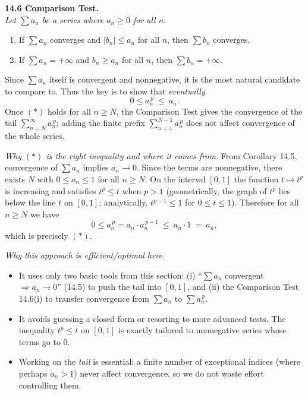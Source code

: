\documentclass[12pt]{article}
\begin{document}
\noindent\textbf{14.6 Comparison Test.}\\
\textit{Let $\sum a_n$ be a series where $a_n \ge 0$ for all $n$.}
\begin{enumerate}[label=(\roman*), leftmargin=2.5em, itemsep=0.25em]
  \item If $\sum a_n$ converges and $|b_n| \le a_n$ for all $n$, then $\sum b_n$ converges.
  \item If $\sum a_n = +\infty$ and $b_n \ge a_n$ for all $n$, then $\sum b_n = +\infty$.
\end{enumerate}

Since $\sum a_n$ itself is convergent and nonnegative, it is the most natural candidate to compare to. Thus the key is to show that \emph{eventually}
\[
0\le a_n^{\,p}\ \le\ a_n .
\tag{$\ast$}
\]
Once $(\ast)$ holds for all $n\ge N$, the Comparison Test gives the convergence of the tail $\sum_{n=N}^\infty a_n^{\,p}$; adding the finite prefix $\sum_{n=1}^{N-1} a_n^{\,p}$ does not affect convergence of the whole series.

\emph{Why $(\ast)$ is the right inequality and where it comes from.}
From Corollary 14.5, convergence of $\sum a_n$ implies $a_n\to 0$. Since the terms are nonnegative, there exists $N$ with $0\le a_n\le 1$ for all $n\ge N$. On the interval $[0,1]$ the function $t\mapsto t^p$ is increasing and satisfies $t^p\le t$ when $p>1$ (geometrically, the graph of $t^p$ lies below the line $t$ on $[0,1]$; analytically, $t^{p-1}\le 1$ for $0\le t\le 1$). Therefore for all $n\ge N$ we have
\[
0\le a_n^{\,p}=a_n\cdot a_n^{\,p-1}\ \le\ a_n\cdot 1\ =\ a_n,
\]
which is precisely $(\ast)$.

\emph{Why this approach is efficient/optimal here.}
\begin{itemize}
  \item It uses only two basic tools from this section: (i) ``$\sum a_n$ convergent $\Rightarrow a_n\to0$'' (14.5) to push the tail into $[0,1]$, and (ii) the Comparison Test 14.6(i) to transfer convergence from $\sum a_n$ to $\sum a_n^{\,p}$.
  \item It avoids guessing a closed form or resorting to more advanced tests. The inequality $t^p\le t$ on $[0,1]$ is exactly tailored to nonnegative series whose terms go to $0$.
  \item Working on the \emph{tail} is essential: a finite number of exceptional indices (where perhaps $a_n>1$) never affect convergence, so we do not waste effort controlling them.
\end{itemize}
\end{document}
